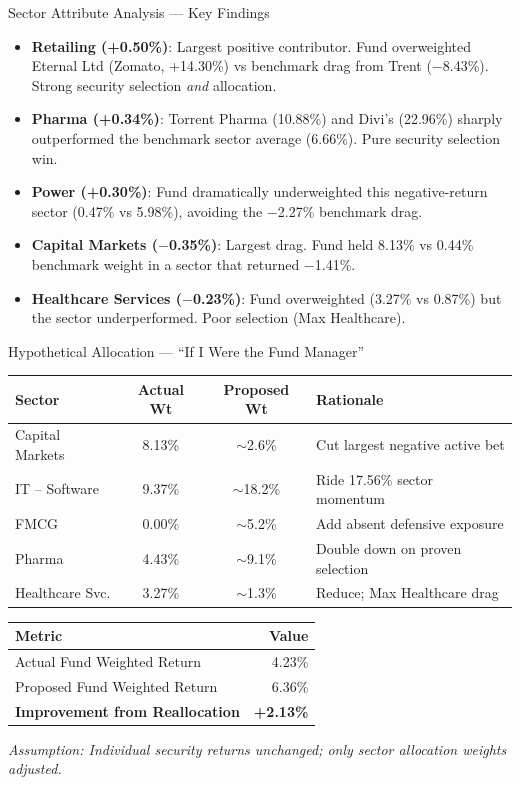 \documentclass[11pt, aspectratio=43]{beamer}
\begin{document}
\begin{frame}{Sector Attribute Analysis --- Key Findings}
\begin{itemize}
    \small
    \item \textcolor{posgreen}{\textbf{Retailing (+0.50\%)}}: Largest positive contributor. Fund overweighted Eternal Ltd (Zomato, +14.30\%) vs benchmark drag from Trent ($-$8.43\%). Strong security selection \textit{and} allocation.
    \item \textcolor{posgreen}{\textbf{Pharma (+0.34\%)}}: Torrent Pharma (10.88\%) and Divi's (22.96\%) sharply outperformed the benchmark sector average (6.66\%). Pure security selection win.
    \item \textcolor{posgreen}{\textbf{Power (+0.30\%)}}: Fund dramatically underweighted this negative-return sector (0.47\% vs 5.98\%), avoiding the $-$2.27\% benchmark drag.
    \item \textcolor{negred}{\textbf{Capital Markets ($-$0.35\%)}}: Largest drag. Fund held 8.13\% vs 0.44\% benchmark weight in a sector that returned $-$1.41\%.
    \item \textcolor{negred}{\textbf{Healthcare Services ($-$0.23\%)}}: Fund overweighted (3.27\% vs 0.87\%) but the sector underperformed. Poor selection (Max Healthcare).
\end{itemize}
\end{frame}


\begin{frame}{Hypothetical Allocation --- ``If I Were the Fund Manager''}
\centering
\footnotesize
\begin{tabular}{l c c l}
\toprule
\textbf{Sector} & \textbf{Actual Wt} & \textbf{Proposed Wt} & \textbf{Rationale} \\
\midrule
Capital Markets & 8.13\% & $\sim$2.6\% & Cut largest negative active bet \\
IT -- Software & 9.37\% & $\sim$18.2\% & Ride 17.56\% sector momentum \\
FMCG & 0.00\% & $\sim$5.2\% & Add absent defensive exposure \\
Pharma & 4.43\% & $\sim$9.1\% & Double down on proven selection \\
Healthcare Svc. & 3.27\% & $\sim$1.3\% & Reduce; Max Healthcare drag \\
\bottomrule
\end{tabular}

\vspace{0.8em}
\begin{tabular}{l r}
\toprule
\textbf{Metric} & \textbf{Value} \\
\midrule
Actual Fund Weighted Return & 4.23\% \\
Proposed Fund Weighted Return & 6.36\% \\
\textbf{Improvement from Reallocation} & \textbf{+2.13\%} \\
\bottomrule
\end{tabular}

\vspace{0.5em}
\footnotesize
\textit{Assumption: Individual security returns unchanged; only sector allocation weights adjusted.}
\end{frame}
\end{document}
